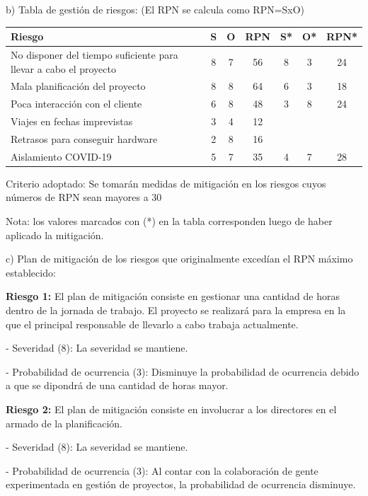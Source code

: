 \documentclass[11pt]{charter}
\begin{document}
b) Tabla de gestión de riesgos:      (El RPN se calcula como RPN=SxO)

\begin{table}[htpb]
\centering
\begin{tabularx}{\linewidth}{@{}|X|c|c|c|c|c|c|@{}}
\hline
\rowcolor[HTML]{C0C0C0} 
Riesgo & S & O & RPN & S* & O* & RPN* \\ \hline
   No disponer del tiempo suficiente para llevar a cabo el proyecto    &  8 &  7 &  56   &  8  &  3  &  24    \\ \hline
   Mala planificación del proyecto    &  8 &  8 &  64   &  6  &  3  &  18    \\ \hline
   Poca interacción con el cliente    &  6 &  8 &  48   &  3  &  8  &  24    \\ \hline
   Viajes en fechas imprevistas    &  3 &  4 &  12   &    &    &      \\ \hline
   Retrasos para conseguir hardware    &  2 &  8 &  16   &    &    &      \\ \hline
   Aislamiento COVID-19    &  5 &  7 &  35   &  4  &  7  &  28    \\ \hline
\end{tabularx}%
\end{table}

Criterio adoptado: 
Se tomarán medidas de mitigación en los riesgos cuyos números de RPN sean mayores a 30

Nota: los valores marcados con (*) en la tabla corresponden luego de haber aplicado la mitigación.

c) Plan de mitigación de los riesgos que originalmente excedían el RPN máximo establecido:
 
\textbf{Riesgo 1: } El plan de mitigación consiste en gestionar una cantidad de horas dentro de la jornada de trabajo. El proyecto se realizará para la empresa en la que el principal responsable de llevarlo a cabo trabaja actualmente.
  
  - Severidad (8): La severidad se mantiene.
  
  - Probabilidad de ocurrencia (3): Disminuye la probabilidad de ocurrencia debido a que se dipondrá de una cantidad de horas mayor.

\textbf{Riesgo 2: } El plan de mitigación consiste en involucrar a los directores en el armado de la planificación.
  
  - Severidad (8): La severidad se mantiene.
  
  - Probabilidad de ocurrencia (3): Al contar con la colaboración de gente experimentada en gestión de proyectos, la probabilidad de ocurrencia disminuye.
\end{document}
